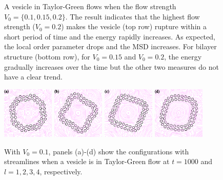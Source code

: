 \documentclass[aps,prl,preprint,groupedaddress]{revtex4-2}
\begin{document}
\begin{figure}
\begin{center}
  \end{center}
\caption{\label{fig:BC1_TG} A vesicle in Taylor-Green flows when the flow strength $V_0=\{0.1, 0.15, 0.2\}$. The result indicates that the highest flow strength ($V_0=0.2$) makes the vesicle (top row) rupture within a short period of time and the energy rapidly increases. As expected, the local order parameter drops and the MSD increases. For bilayer structure (bottom row), for $V_0=0.15$ and $V_0 = 0.2$, the energy gradually increases over the time but the other two measures do not have  a clear trend.}
\end{figure}



\begin{figure}
  \begin{center}
  \includegraphics[width=0.22\textwidth]{VTG_Scale_0.pdf}
  \includegraphics[width=0.22\textwidth]{VTG_Scale_1.pdf}
  \includegraphics[width=0.22\textwidth]{VTG_Scale_2.pdf} 
    \includegraphics[width=0.22\textwidth]{VTG_Scale_3.pdf}
      \end{center}
  \vspace{-20pt}  
  \caption{\label{fig:BTG_Scale_flow} With $V_0=0.1$, panels (a)-(d) show the configurations with streamlines when a vesicle is in Taylor-Green flow at $t=1000$ and $l= 1,2,3,4$, respectively.}
\end{figure}
\end{document}

